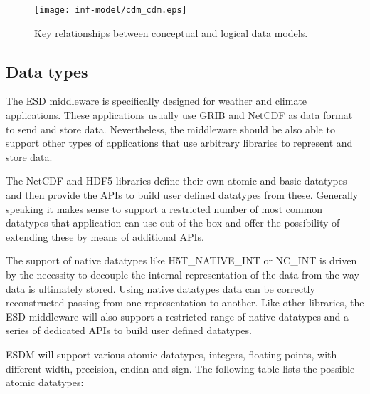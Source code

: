 \begin{figure}
	\centering
	\texttt{[image: inf-model/cdm\_cdm.eps]}
	\caption{Key relationships between conceptual and logical data models.}
	\label{fig:dm_map}
\end{figure}


%




\subsection{Data types}
\label{sec: viewpoints/logical/datatypes}


The ESD middleware is specifically designed for weather and climate applications.
These applications usually use GRIB and NetCDF as data format to send and store
data. Nevertheless, the middleware should be also able to support other types of
applications that use arbitrary libraries to represent and store data.

The NetCDF and HDF5 libraries define their own atomic and basic datatypes and
then provide the APIs to build user defined datatypes from these. Generally
speaking it makes sense to support a restricted number of most common datatypes
that application can use out of the box and offer the possibility of extending
these by means of additional APIs.

The support of native datatypes like H5T\_NATIVE\_INT or NC\_INT is driven by the necessity to decouple the internal representation of the data from the way data is ultimately stored.
Using native datatypes data can be correctly reconstructed passing from one representation to another.
Like other libraries, the ESD middleware will also support a restricted range of native datatypes and a series of dedicated APIs to build user defined datatypes.

\medskip

ESDM will support various atomic datatypes, integers, floating points, with
different width, precision, endian and sign. The following table lists the
possible atomic datatypes:

